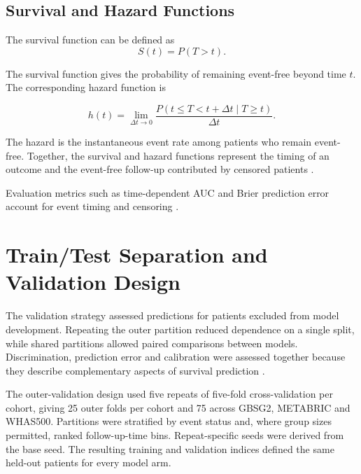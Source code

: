 \subsection{Survival and Hazard Functions}\label{survival-and-hazard-functions}

The survival function can be defined as
\begin{equation}
    S(t) = P(T > t).
\end{equation}


The survival function gives the probability of remaining event-free beyond time $t$. The corresponding hazard function is

\begin{equation}
    h(t) = \lim_{\Delta t \rightarrow 0}\frac{P(t \leq T < t + \Delta t \mid T \geq t)}{\Delta t}.
\end{equation}



The hazard is the instantaneous event rate among patients who remain event-free. Together, the survival and hazard functions represent the timing of an outcome and the event-free follow-up contributed by censored patients \cite{ref14,ref26}.

Evaluation metrics such as time-dependent AUC and Brier prediction error account for event timing and censoring \cite{ref26,ref47}.

\section{Train/Test Separation and Validation Design}\label{traintest-separation-and-validation-design}

The validation strategy assessed predictions for patients excluded from model development. Repeating the outer partition reduced dependence on a single split, while shared partitions allowed paired comparisons between models. Discrimination, prediction error and calibration were assessed together because they describe complementary aspects of survival prediction \cite{ref26,ref27}.

The outer-validation design used five repeats of five-fold cross-validation per cohort, giving 25 outer folds per cohort and 75 across GBSG2, METABRIC and WHAS500. Partitions were stratified by event status and, where group sizes permitted, ranked follow-up-time bins. Repeat-specific seeds were derived from the base seed. The resulting training and validation indices defined the same held-out patients for every model arm.

